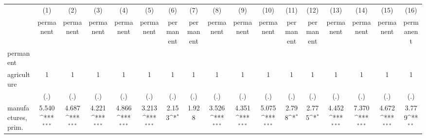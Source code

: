 {
\def\sym#1{\ifmmode^{#1}\else\(^{#1}\)\fi}
\begin{tabular}{l*{16}{c}}
\hline\hline
                    &\multicolumn{1}{c}{(1)}&\multicolumn{1}{c}{(2)}&\multicolumn{1}{c}{(3)}&\multicolumn{1}{c}{(4)}&\multicolumn{1}{c}{(5)}&\multicolumn{1}{c}{(6)}&\multicolumn{1}{c}{(7)}&\multicolumn{1}{c}{(8)}&\multicolumn{1}{c}{(9)}&\multicolumn{1}{c}{(10)}&\multicolumn{1}{c}{(11)}&\multicolumn{1}{c}{(12)}&\multicolumn{1}{c}{(13)}&\multicolumn{1}{c}{(14)}&\multicolumn{1}{c}{(15)}&\multicolumn{1}{c}{(16)}\\
                    &\multicolumn{1}{c}{permanent}&\multicolumn{1}{c}{permanent}&\multicolumn{1}{c}{permanent}&\multicolumn{1}{c}{permanent}&\multicolumn{1}{c}{permanent}&\multicolumn{1}{c}{permanent}&\multicolumn{1}{c}{permanent}&\multicolumn{1}{c}{permanent}&\multicolumn{1}{c}{permanent}&\multicolumn{1}{c}{permanent}&\multicolumn{1}{c}{permanent}&\multicolumn{1}{c}{permanent}&\multicolumn{1}{c}{permanent}&\multicolumn{1}{c}{permanent}&\multicolumn{1}{c}{permanent}&\multicolumn{1}{c}{permanent}\\
\hline
permanent           &                     &                     &                     &                     &                     &                     &                     &                     &                     &                     &                     &                     &                     &                     &                     &                     \\
agriculture         &           1         &           1         &           1         &           1         &           1         &           1         &           1         &           1         &           1         &           1         &           1         &           1         &           1         &           1         &           1         &           1         \\
                    &         (.)         &         (.)         &         (.)         &         (.)         &         (.)         &         (.)         &         (.)         &         (.)         &         (.)         &         (.)         &         (.)         &         (.)         &         (.)         &         (.)         &         (.)         &         (.)         \\
[1em]
manufactures, prim. &       5.540\sym{***}&       4.687\sym{***}&       4.221\sym{***}&       4.866\sym{***}&       3.213\sym{***}&       2.153\sym{*}  &       1.928         &       3.526\sym{***}&       4.351\sym{***}&       5.075\sym{***}&       2.798\sym{*}  &       2.775\sym{*}  &       4.452\sym{***}&       7.370\sym{***}&       4.672\sym{***}&       3.779\sym{**} \\

\end{tabular}}
